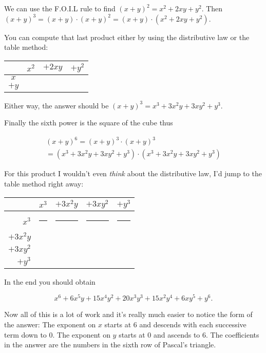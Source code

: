 We can use the F.O.I.L rule to find $(x+y)^2 = x^2 + 2xy + y^2$. 
Then $(x+y)^3 =  (x+y) \cdot (x+y)^2 = (x+y) \cdot  (x^2 + 2xy + y^2)$.

You can compute that last product either by using the distributive law
or the table method:

\begin{center}
\begin{tabular}{c|ccc}
      & $x^2$ & $+ 2xy$ & $+ y^2$ \\ \hline
$x$   &       &         &         \\
$+ y$ &       &         &         \\
\end{tabular} 
\end{center}

Either way, the answer should be $(x+y)^3 = x^3 + 3x^2y + 3xy^2 + y^3$.

Finally the sixth power is the square of the cube thus

\begin{gather*} 
(x+y)^6 = (x+y)^3 \cdot (x+y)^3 \\
= (x^3 + 3x^2y + 3xy^2 + y^3) \cdot (x^3 + 3x^2y + 3xy^2 + y^3)
\end{gather*}

For this product I wouldn't even \emph{think} about the distributive
law, I'd jump to the table method right away:

\begin{center}
\begin{tabular}{r|cccc}
\rule[-6pt]{0pt}{24pt} & $x^3$ & $+ 3x^2y$ & $+ 3xy^2$ & $+ y^3$ \\ \hline
\rule[-6pt]{0pt}{24pt} $x^3$ & \rule{45pt}{0pt} & \rule{45pt}{0pt} & \rule{45pt}{0pt} & \rule{45pt}{0pt} \\
\rule[-6pt]{0pt}{24pt} $+ 3x^2y$ &       &           &           &         \\
\rule[-6pt]{0pt}{24pt} $+ 3xy^2$ &       &           &           &         \\
\rule[-6pt]{0pt}{24pt} $+ y^3$   &       &           &           &         \\

\end{tabular} 
\end{center}

In the end you should obtain 

\[ x^6 + 6 x^5y + 15 x^4y^2 + 20 x^3y^3 + 15 x^2y^4 + 6 xy^5 + y^6. \]

Now all of this is a lot of work and it's really much easier
to notice the form of the answer:  The exponent on $x$ starts at 6 and descends
with each successive term down to 0.  The exponent on $y$ starts at 0
and ascends to 6.  The coefficients in the answer are the numbers in the 
sixth row of Pascal's triangle.

